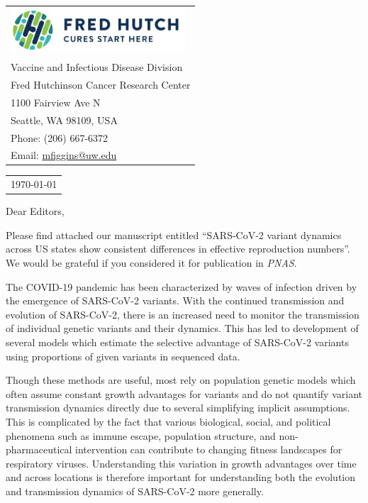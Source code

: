 \documentclass[11pt]{article}
\begin{document}
\thispagestyle{empty} %

\mbox{}\hfill
\begin{tabular}{l @{}}
	\includegraphics[width=6.5cm]{figures/fhcrc_logo} \\
	Vaccine and Infectious Disease Division \\
	Fred Hutchinson Cancer Research Center \\
	1100 Fairview Ave N \\
	Seattle, WA 98109, USA \\
	Phone: (206) 667-6372 \\
	Email: \href{mailto:mfiggins@uw.edu}{mfiggins@uw.edu} \\
\end{tabular}

\vspace{0.1in} %

\begin{tabular}{@{} l}
  \today
\end{tabular}

\vspace{0.1in} %

Dear Editors,

\medskip %

Please find attached our manuscript entitled ``SARS-CoV-2 variant dynamics across US states show consistent differences in effective reproduction numbers''.
We would be grateful if you considered it for publication in \textit{PNAS}.

The COVID-19 pandemic has been characterized by waves of infection driven by the emergence of SARS-CoV-2 variants.
With the continued transmission and evolution of SARS-CoV-2, there is an increased need to monitor the transmission of individual genetic variants and their dynamics.
This has led to development of several models which estimate the selective advantage of SARS-CoV-2 variants using proportions of given variants in sequenced data.

Though these methods are useful, most rely on population genetic models which often assume constant growth advantages for variants and do not quantify variant transmission dynamics directly due to several simplifying implicit assumptions.
This is complicated by the fact that various biological, social, and political phenomena such as immune escape, population structure, and non-pharmaceutical intervention can contribute to changing fitness landscapes for respiratory viruses.
Understanding this variation in growth advantages over time and across locations is therefore important for understanding both the evolution and transmission dynamics of SARS-CoV-2 more generally.
\end{document}
